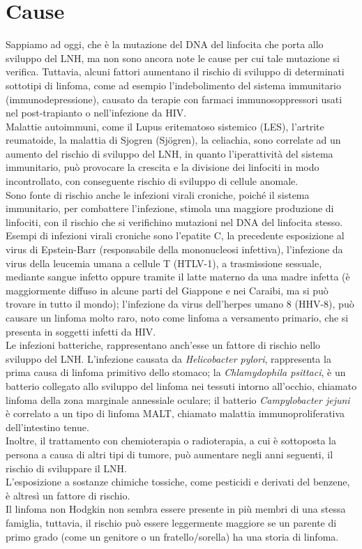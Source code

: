 \section{Cause}
Sappiamo ad oggi, che è la mutazione del DNA del linfocita che porta allo sviluppo del LNH, 
ma non sono ancora note le cause per cui tale mutazione si verifica. 
Tuttavia, alcuni fattori aumentano il rischio di sviluppo di determinati sottotipi di linfoma, come ad esempio 
l’indebolimento del sistema immunitario (immunodepressione), causato da terapie con farmaci 
immunosoppressori usati nel post-trapianto o nell'infezione da HIV\cite{AMERICANCS}.\\
Malattie autoimmuni, come il Lupus eritematoso sistemico (LES), l'artrite reumatoide, 
la malattia di Sjogren (Sjögren), la celiachia, sono correlate ad un aumento del rischio di sviluppo del LNH, 
in quanto l’iperattività del sistema immunitario, può provocare la crescita e la 
divisione dei linfociti in modo incontrollato, 
con conseguente rischio di sviluppo di cellule anomale\cite{AMERICANCS}.\\
Sono fonte di rischio anche le infezioni virali croniche, poiché il sistema immunitario, 
per combattere l’infezione, stimola una maggiore produzione di linfociti, con il rischio che si 
verifichino mutazioni nel DNA del linfocita stesso. Esempi di infezioni virali croniche sono l’epatite C, 
la precedente esposizione al virus di Epstein-Barr (responsabile della mononucleosi infettiva), 
l'infezione da virus della leucemia umana a cellule T (HTLV-1), a trasmissione sessuale, mediante sangue infetto 
oppure tramite il latte materno da una madre infetta (è maggiormente diffuso in alcune parti del 
Giappone e nei Caraibi, ma si può trovare in tutto il mondo); l’infezione da virus dell'herpes umano 8 (HHV-8), 
può causare un linfoma molto raro, noto come linfoma a versamento primario, che si presenta in soggetti infetti da 
HIV\cite{AMERICANCS}.\\
Le infezioni batteriche, rappresentano anch’esse un fattore di rischio nello sviluppo del LNH. 
L’infezione causata da \emph{Helicobacter pylori}, rappresenta la prima causa di linfoma primitivo dello stomaco; 
la \emph{Chlamydophila psittaci}, è un batterio collegato allo sviluppo del linfoma nei tessuti intorno all’occhio, 
chiamato linfoma della zona marginale annessiale oculare; il batterio \emph{Campylobacter jejuni} è correlato a un tipo 
di linfoma MALT, chiamato malattia immunoproliferativa dell'intestino tenue\cite{AMERICANCS}.\\
Inoltre, il trattamento con chemioterapia o radioterapia, a cui è sottoposta la persona a causa di altri tipi di tumore, 
può aumentare negli anni seguenti, il rischio di sviluppare il LNH\cite{AMERICANCS}.\\
L’esposizione a sostanze chimiche tossiche, come pesticidi e derivati del benzene, è altresì un fattore di rischio.\\ 
Il linfoma non Hodgkin non sembra essere presente in più membri di una stessa famiglia, tuttavia, 
il rischio può essere leggermente maggiore se un parente di primo grado (come un genitore o un fratello/sorella) 
ha una storia di linfoma\cite{AMERICANCS}.

